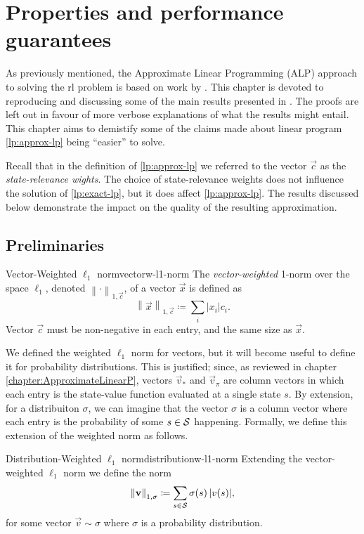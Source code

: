 \chapter{Properties and performance guarantees}
\label{chapter:PropertiesGuarantees}

As previously mentioned, the Approximate Linear Programming (ALP) approach to
solving the \ac{rl} problem is based on work by \citeauthor{farias2003LP2ADP}.
This chapter is devoted to reproducing and discussing some of the main results
presented in \cite{farias2003LP2ADP}. The proofs are left out in favour of more
verbose explanations of what the results might entail. This chapter aims to
demistify some of the claims made about linear program \eqref{lp:approx-lp}
being ``easier'' to solve.

Recall that in the definition of \eqref{lp:approx-lp} we referred to the vector
$\vec{c}$ as the \emph{state-relevance wights}. The choice of state-relevance
weights does not influence the solution of \eqref{lp:exact-lp}, but it does
affect \eqref{lp:approx-lp}. The results discussed below demonstrate the impact
on the quality of the resulting approximation.

\section{Preliminaries}

\begin{dfn}{Vector-Weighted $\ell_1$ norm}{vectorw-l1-norm}
    The \emph{vector-weighted} 1-norm over the space $\ell_1$, denoted $\left\|
    \cdot \right\|_{1, \vec{c}}$, of a vector $\vec{x}$ is defined as
    \[
        \left\| \vec{x} \right\|_{1, \vec{c}} \coloneqq  \sum_i |x_i| c_i.
    \]
    Vector $\vec{c}$ must be non-negative in each entry, and the same size as
    $\vec{x}$.
\end{dfn}

We defined the weighted $\ell_1$ norm for vectors, but it will become useful to
define it for probability distributions. This is justified; since, as reviewed
in chapter \ref{chapter:ApproximateLinearP}, vectors $\vec{v}_*$ and
$\vec{v}_\pi$ are column vectors in which each entry is the state-value function
evaluated at a single state $s$. By extension, for a distribuiton $\sigma$, we
can imagine that the vector $\sigma$ is a column vector where each entry is the
probability of some $s \in \mathcal{S}$ happening. Formally, we define this
extension of the weighted norm as follows.

\begin{dfn}{Distribution-Weighted $\ell_1$ norm}{distributionw-l1-norm}
    Extending the vector-weighted $\ell_1$ norm we define the norm
    \[
        \left\| \mathbf{v} \right\|_{1, \sigma} \coloneqq \sum_{s \in \mathcal{S}} \sigma(s) \, |v(s)|,
    \]
    for some vector $\vec{v} \sim \sigma$ where $\sigma$ is a probability
    distribution.
\end{dfn}

